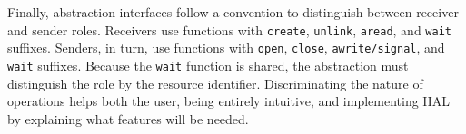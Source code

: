 			Finally, abstraction interfaces follow a convention to distinguish
			between receiver and sender roles. Receivers use functions with
			\texttt{create}, \texttt{unlink}, \texttt{aread}, and \texttt{wait}
			suffixes. Senders, in turn, use functions with \texttt{open},
			\texttt{close}, \texttt{awrite/signal}, and \texttt{wait} suffixes.
			Because the \texttt{wait} function is shared, the abstraction must
			distinguish the role by the resource identifier. Discriminating the
			nature of operations helps both the user, being entirely intuitive,
			and implementing HAL by explaining what features will be needed.





